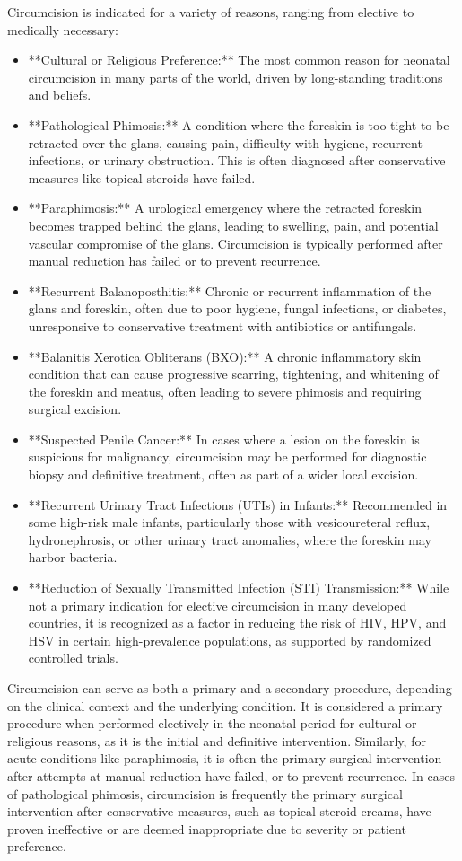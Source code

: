 Circumcision is indicated for a variety of reasons, ranging from elective to medically necessary:
\begin{itemize}
  \item **Cultural or Religious Preference:** The most common reason for neonatal circumcision in many parts of the world, driven by long-standing traditions and beliefs.
  \item **Pathological Phimosis:** A condition where the foreskin is too tight to be retracted over the glans, causing pain, difficulty with hygiene, recurrent infections, or urinary obstruction. This is often diagnosed after conservative measures like topical steroids have failed.
  \item **Paraphimosis:** A urological emergency where the retracted foreskin becomes trapped behind the glans, leading to swelling, pain, and potential vascular compromise of the glans. Circumcision is typically performed after manual reduction has failed or to prevent recurrence.
  \item **Recurrent Balanoposthitis:** Chronic or recurrent inflammation of the glans and foreskin, often due to poor hygiene, fungal infections, or diabetes, unresponsive to conservative treatment with antibiotics or antifungals.
  \item **Balanitis Xerotica Obliterans (BXO):** A chronic inflammatory skin condition that can cause progressive scarring, tightening, and whitening of the foreskin and meatus, often leading to severe phimosis and requiring surgical excision.
  \item **Suspected Penile Cancer:** In cases where a lesion on the foreskin is suspicious for malignancy, circumcision may be performed for diagnostic biopsy and definitive treatment, often as part of a wider local excision.
  \item **Recurrent Urinary Tract Infections (UTIs) in Infants:** Recommended in some high-risk male infants, particularly those with vesicoureteral reflux, hydronephrosis, or other urinary tract anomalies, where the foreskin may harbor bacteria.
  \item **Reduction of Sexually Transmitted Infection (STI) Transmission:** While not a primary indication for elective circumcision in many developed countries, it is recognized as a factor in reducing the risk of HIV, HPV, and HSV in certain high-prevalence populations, as supported by randomized controlled trials.
\end{itemize}

Circumcision can serve as both a primary and a secondary procedure, depending on the clinical context and the underlying condition. It is considered a primary procedure when performed electively in the neonatal period for cultural or religious reasons, as it is the initial and definitive intervention. Similarly, for acute conditions like paraphimosis, it is often the primary surgical intervention after attempts at manual reduction have failed, or to prevent recurrence. In cases of pathological phimosis, circumcision is frequently the primary surgical intervention after conservative measures, such as topical steroid creams, have proven ineffective or are deemed inappropriate due to severity or patient preference.

